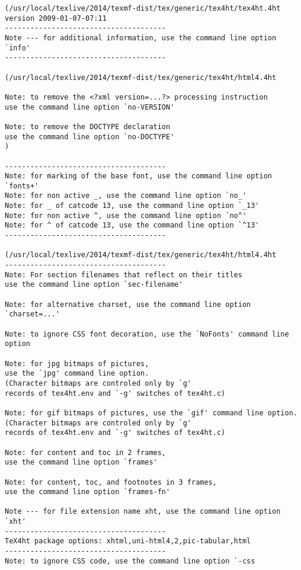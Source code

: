\begin{Verbatim}[fontsize=\tiny]
(/usr/local/texlive/2014/texmf-dist/tex/generic/tex4ht/tex4ht.4ht
version 2009-01-07-07:11
--------------------------------------
Note --- for additional information, use the command line option `info'
--------------------------------------

(/usr/local/texlive/2014/texmf-dist/tex/generic/tex4ht/html4.4ht

Note: to remove the <?xml version=...?> processing instruction 
use the command line option `no-VERSION'

Note: to remove the DOCTYPE declaration 
use the command line option `no-DOCTYPE'
)

--------------------------------------
Note: for marking of the base font, use the command line option `fonts+'
Note: for non active _, use the command line option `no_'
Note: for _ of catcode 13, use the command line option `_13'
Note: for non active ^, use the command line option `no^'
Note: for ^ of catcode 13, use the command line option `^13'
--------------------------------------

(/usr/local/texlive/2014/texmf-dist/tex/generic/tex4ht/html4.4ht
--------------------------------------
Note: For section filenames that reflect on their titles 
use the command line option `sec-filename'

Note: for alternative charset, use the command line option `charset=...'

Note: to ignore CSS font decoration, use the `NoFonts' command line option

Note: for jpg bitmaps of pictures, 
use the `jpg' command line option. 
(Character bitmaps are controled only by `g' 
records of tex4ht.env and `-g' switches of tex4ht.c) 

Note: for gif bitmaps of pictures, use the `gif' command line option. 
(Character bitmaps are controled only by `g' 
records of tex4ht.env and `-g' switches of tex4ht.c) 

Note: for content and toc in 2 frames, 
use the command line option `frames'

Note: for content, toc, and footnotes in 3 frames, 
use the command line option `frames-fn'

Note --- for file extension name xht, use the command line option `xht'
--------------------------------------
TeX4ht package options: xhtml,uni-html4,2,pic-tabular,html
--------------------------------------
Note: to ignore CSS code, use the command line option `-css


\end{Verbatim}
